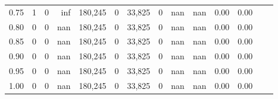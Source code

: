 \begin{tabular}{rrrrrrrrrrrrrr}
0.75 &       1 &       0 &     inf &  180,245 &        0 &  33,825 &       0 &   nan &   nan &  0.00 &      0.00 \\
0.80 &       0 &       0 &     nan &  180,245 &        0 &  33,825 &       0 &   nan &   nan &  0.00 &      0.00 \\
0.85 &       0 &       0 &     nan &  180,245 &        0 &  33,825 &       0 &   nan &   nan &  0.00 &      0.00 \\
0.90 &       0 &       0 &     nan &  180,245 &        0 &  33,825 &       0 &   nan &   nan &  0.00 &      0.00 \\
0.95 &       0 &       0 &     nan &  180,245 &        0 &  33,825 &       0 &   nan &   nan &  0.00 &      0.00 \\
1.00 &       0 &       0 &     nan &  180,245 &        0 &  33,825 &       0 &   nan &   nan &  0.00 &      0.00 \\
\bottomrule
\end{tabular}
